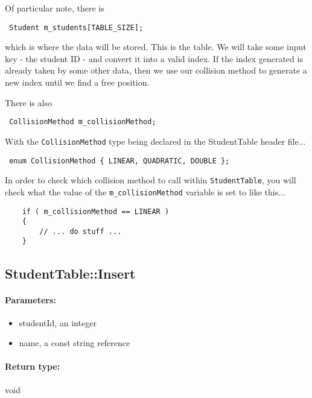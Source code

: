 \documentclass[a4paper,12pt,oneside]{book}
\begin{document}
Of particular note, there is

\begin{center}
    \texttt{
        Student m\_students[TABLE\_SIZE];
    }
\end{center}

which is where the data will be stored. This is the table. We will
take some input key - the student ID - and convert it into a valid index.
If the index generated is already taken by some other data, then we
use our collision method to generate a new index until we find a free position.

There is also

\begin{center}
    \texttt{
        CollisionMethod m\_collisionMethod;
    }
\end{center}

With the \texttt{CollisionMethod} type being declared in the StudentTable header file...

\begin{center}
    \texttt{
        enum CollisionMethod \{ LINEAR, QUADRATIC, DOUBLE \};
    }
\end{center}

In order to check which collision method to call within \texttt{StudentTable},
you will check what the value of the \texttt{m\_collisionMethod} variable is
set to like this...

\begin{verbatim}
    if ( m_collisionMethod == LINEAR )
    {
        // ... do stuff ...
    }
\end{verbatim}



\subsection{StudentTable::Insert}

\paragraph{Parameters:}

\begin{itemize}
    \item   studentId, an integer
    \item   name, a const string reference
\end{itemize}

\paragraph{Return type:} void
\end{document}
